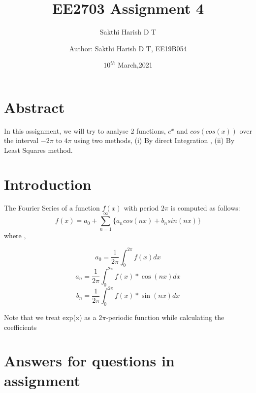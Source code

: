 \documentclass{article}
\title{EE2703 Assignment 4}
\author{Sakthi Harish D T}
\author{Author: Sakthi Harish D T, EE19B054}
\date{$10^{th}$ March,2021}
\begin{document}

\section{Abstract}
In this assignment, we will try to analyse 2 functions, $e^x$  and $cos(cos(x))$ over the interval $-2\pi$ to $4\pi$ using two methods, (i) By direct Integration , (ii) By Least Squares method.

\section{Introduction}
The Fourier Series of a function $f(x)$ with period $2\pi$ is computed as follows:
\begin{equation}
    f(x) = a_0 + \sum_{n=1}^{\infty}\{ a_ncos(nx) +b_nsin(nx)\}
\end{equation}
\newline
where , \newline


\[a_0 = \frac{1}{2\pi} \int_0^{2\pi}f(x)dx\]
\[a_n = \frac{1}{2\pi} \int_0^{2\pi}f(x)*\cos(nx)dx\]
\[b_n = \frac{1}{2\pi} \int_0^{2\pi}f(x)*\sin(nx)dx\]

Note that we treat exp(x) as a $2\pi$-periodic function while calculating the coefficients

\newpage
\section{Answers for questions in assignment}
\end{document}
